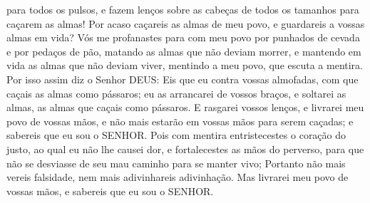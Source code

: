 { para todos os pulsos, e fazem lenços sobre as cabeças de todos os tamanhos para caçarem as almas! Por acaso caçareis as almas de meu povo, e guardareis a vossas
{} almas em vida?
  Vós me profanastes para com meu povo por punhados de cevada e por pedaços de pão, matando as almas que não deviam morrer, e mantendo em vida as almas que não deviam viver, mentindo a meu povo, que escuta a mentira.
  Por isso assim diz o Senhor DEUS: Eis que eu contra vossas almofadas, com que caçais as almas como
{} pássaros; eu as arrancarei de vossos braços, e soltarei as almas, as almas que caçais como pássaros.
  E rasgarei vossos lenços, e livrarei meu povo de vossas mãos, e não mais estarão em vossas mãos para serem caçadas; e sabereis que eu sou o SENHOR.
  Pois com mentira entristecestes o coração do justo, ao qual eu não lhe causei dor, e fortalecestes as mãos do perverso, para que não se desviasse de seu mau caminho para se manter vivo;
  Portanto não mais vereis falsidade, nem mais adivinhareis adivinhação. Mas livrarei meu povo de vossas mãos, e sabereis que eu sou o SENHOR.
\par }


